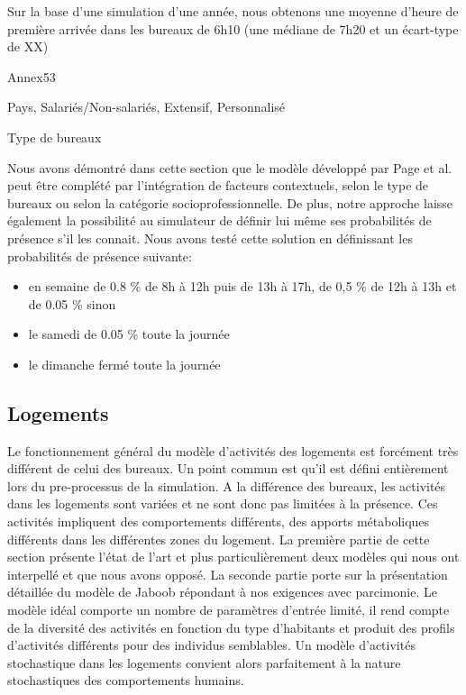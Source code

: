 Sur la base d'une simulation d'une année, nous obtenons une moyenne d'heure de première arrivée dans les bureaux de 6h10 (une médiane de 7h20 et un écart-type de XX)


Annex53

Pays, Salariés/Non-salariés, Extensif, Personnalisé

Type de bureaux


Nous avons démontré dans cette section que le modèle développé par Page et al. \cite{Page-08} peut être complété par l'intégration de facteurs contextuels, selon le type de bureaux ou selon la catégorie socioprofessionnelle. De plus, notre approche laisse également la possibilité au simulateur de définir lui même ses probabilités de présence s'il les connait. Nous avons testé cette solution en définissant les probabilités de présence suivante:
\begin{itemize}
\item en semaine de 0.8 \% de 8h à 12h puis de 13h à 17h, de 0,5 \% de 12h à 13h et de 0.05 \% sinon
\item le samedi de 0.05 \% toute la journée
\item le dimanche fermé toute la journée
\end{itemize}
 

\subsection{Logements}

Le fonctionnement général du modèle d'activités des logements est forcément très différent de celui des bureaux. Un point commun est qu'il est défini entièrement lors du pre-processus de la simulation. A la différence des bureaux, les activités dans les logements sont variées et ne sont donc pas limitées à la présence. Ces activités impliquent des comportements différents, des apports métaboliques différents dans les différentes zones du logement. La première partie de cette section présente l'état de l'art et plus particulièrement deux modèles qui nous ont interpellé et que nous avons opposé. La seconde partie porte sur la présentation détaillée du modèle de Jaboob \cite{Jaboob-16} répondant à nos exigences avec parcimonie. Le modèle idéal comporte un nombre de paramètres d'entrée limité, il rend compte de la diversité des activités en fonction du type d'habitants et produit des profils d'activités différents pour des individus semblables. Un modèle d'activités stochastique dans les logements convient alors parfaitement à la nature stochastiques des comportements humains.

